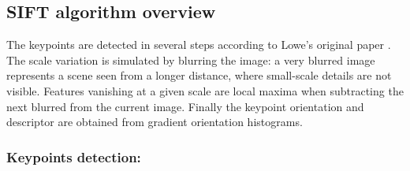 \documentclass[preprint]{iucr}
\begin{document}
\subsection{SIFT algorithm overview}



The keypoints are detected in several steps according to Lowe's
original paper \cite{Lowe99}.
The scale variation is simulated by blurring the image:
a very blurred image represents a scene seen from a longer distance, where
small-scale details are not visible. 
Features vanishing at a given scale are
local maxima when subtracting the next blurred from the current image. Finally
the keypoint orientation and descriptor are obtained from gradient orientation
histograms.


\subsubsection{Keypoints detection:}
\end{document}
